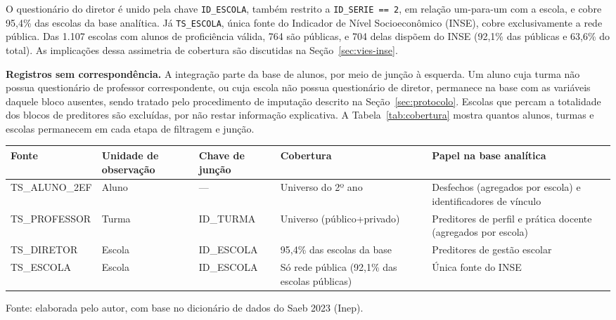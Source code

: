 O questionário do diretor é unido pela chave \texttt{ID\_ESCOLA}, também
restrito a \texttt{ID\_SERIE~==~2}, em relação um-para-um com a escola, e
cobre 95,4\% das escolas da base analítica. Já \texttt{TS\_ESCOLA}, única
fonte do Indicador de Nível Socioeconômico (INSE), cobre exclusivamente a
rede pública. Das 1.107 escolas com alunos de proficiência válida, 764 são
públicas, e 704 delas dispõem do INSE (92,1\% das públicas e 63,6\% do
total). As implicações dessa assimetria de cobertura são discutidas na
Seção~\ref{sec:vies-inse}.

\textbf{Registros sem correspondência.} A integração parte da base de
alunos, por meio de junção à esquerda. Um aluno cuja turma não possua
questionário de professor correspondente, ou cuja escola não possua
questionário de diretor, permanece na base com as variáveis daquele bloco
ausentes, sendo tratado pelo procedimento de imputação descrito na
Seção~\ref{sec:protocolo}. Escolas que percam a totalidade dos blocos de
preditores são excluídas, por não restar informação explicativa. A
Tabela~\ref{tab:cobertura} mostra quantos alunos, turmas e escolas
permanecem em cada etapa de filtragem e junção.

\begin{quadro}[H]
    \centering
    \footnotesize
    \caption{Fontes de microdados do Saeb 2023 utilizadas e critérios de integração}
    \begin{tabular}{|P{2.9cm}|P{1.6cm}|P{2.3cm}|P{2.9cm}|P{3.2cm}|}
        \hline
        \textbf{Fonte} & \textbf{Unidade de observação} & \textbf{Chave de junção} & \textbf{Cobertura} & \textbf{Papel na base analítica} \\
        \hline
        TS\_ALUNO\_2EF & Aluno & --- & Universo do 2º ano & Desfechos (agregados por escola) e identificadores de vínculo \\ \hline
        TS\_PROFESSOR & Turma & ID\_TURMA & Universo (público+privado) & Preditores de perfil e prática docente (agregados por escola) \\ \hline
        TS\_DIRETOR & Escola & ID\_ESCOLA & 95,4\% das escolas da base & Preditores de gestão escolar \\ \hline
        TS\_ESCOLA & Escola & ID\_ESCOLA & Só rede pública (92,1\% das escolas públicas) & Única fonte do INSE \\
        \hline
    \end{tabular}
    \vspace{0.1cm}
    \begin{flushleft}
    {\footnotesize Fonte: elaborada pelo autor, com base no dicionário de
    dados do Saeb 2023 (Inep).}
    \end{flushleft}
    \label{quad:fontes-dados}
\end{quadro}

